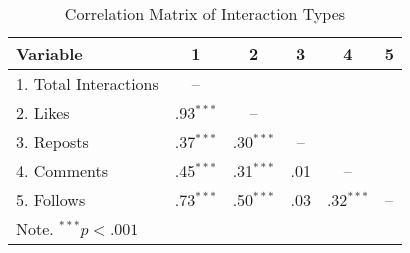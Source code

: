 \begin{table}[htbp]
\centering
\caption{Correlation Matrix of Interaction Types}
\begin{tabular}{lccccc}
\hline
Variable & 1 & 2 & 3 & 4 & 5 \\
\hline
1. Total Interactions & -- \\
2. Likes & .93$^{***}$ & -- \\
3. Reposts & .37$^{***}$ & .30$^{***}$ & -- \\
4. Comments & .45$^{***}$ & .31$^{***}$ & .01 & -- \\
5. Follows & .73$^{***}$ & .50$^{***}$ & .03 & .32$^{***}$ & -- \\
\hline
\multicolumn{6}{p{.95\linewidth}}{\small Note. $^{***}p < .001$}
\end{tabular}
\label{tab:correlations}
\end{table}